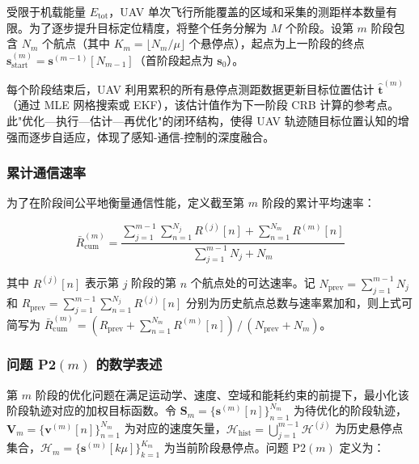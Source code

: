 受限于机载能量 $E_{\mathrm{tot}}$，UAV 单次飞行所能覆盖的区域和采集的测距样本数量有限。为了逐步提升目标定位精度，将整个任务分解为 $M$ 个阶段。设第 $m$ 阶段包含 $N_m$ 个航点（其中 $K_m=\lfloor N_m/\mu\rfloor$ 个悬停点），起点为上一阶段的终点 $\mathbf{s}_{\mathrm{start}}^{(m)}=\mathbf{s}^{(m-1)}[N_{m-1}]$（首阶段起点为 $\mathbf{s}_0$）。

每个阶段结束后，UAV 利用累积的所有悬停点测距数据更新目标位置估计 $\hat{\mathbf{t}}^{(m)}$（通过 MLE 网格搜索或 EKF\cite{Rangzenegger2020}），该估计值作为下一阶段 CRB 计算的参考点。此"优化—执行—估计—再优化"的闭环结构，使得 UAV 轨迹随目标位置认知的增强而逐步自适应，体现了感知-通信-控制的深度融合。

\subsubsection{累计通信速率}

为了在阶段间公平地衡量通信性能，定义截至第 $m$ 阶段的累计平均速率\cite{Zeng2016}：

\begin{equation}
\bar{R}_{\mathrm{cum}}^{(m)}=
\frac{\displaystyle\sum_{j=1}^{m-1}\sum_{n=1}^{N_j}R^{(j)}[n]+\sum_{n=1}^{N_m}R^{(m)}[n]}
{\displaystyle\sum_{j=1}^{m-1}N_j+N_m}
\label{eq:cumulative_rate}
\end{equation}

其中 $R^{(j)}[n]$ 表示第 $j$ 阶段的第 $n$ 个航点处的可达速率。记 $N_{\mathrm{prev}}=\sum_{j=1}^{m-1}N_j$ 和 $R_{\mathrm{prev}}=\sum_{j=1}^{m-1}\sum_{n=1}^{N_j}R^{(j)}[n]$ 分别为历史航点总数与速率累加和，则上式可简写为 $\bar{R}_{\mathrm{cum}}^{(m)}=(R_{\mathrm{prev}}+\sum_{n=1}^{N_m}R^{(m)}[n])\,/\,(N_{\mathrm{prev}}+N_m)$。

\subsubsection{问题 P2$(m)$ 的数学表述}

第 $m$ 阶段的优化问题在满足运动学、速度、空域和能耗约束的前提下，最小化该阶段轨迹对应的加权目标函数。令 $\mathbf{S}_m=\{\mathbf{s}^{(m)}[n]\}_{n=1}^{N_m}$ 为待优化的阶段轨迹，$\mathbf{V}_m=\{\mathbf{v}^{(m)}[n]\}_{n=1}^{N_m}$ 为对应的速度矢量，$\mathcal{H}_{\mathrm{hist}}=\bigcup_{j=1}^{m-1}\mathcal{H}^{(j)}$ 为历史悬停点集合，$\mathcal{H}_m=\{\mathbf{s}^{(m)}[k\mu]\}_{k=1}^{K_m}$ 为当前阶段悬停点。问题 P2$(m)$ 定义为：


